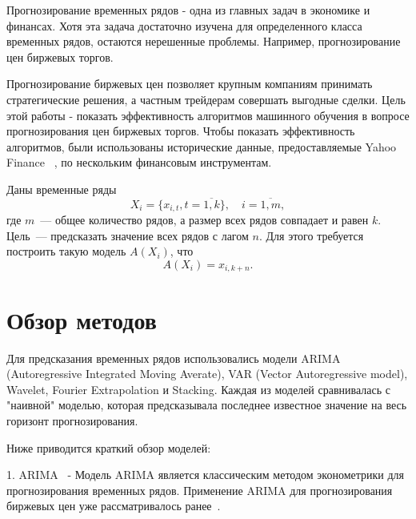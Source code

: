 \documentclass[a4paper,article,14pt]{extarticle}
\begin{document}


\tableofcontents
\pagebreak
{}

Прогнозирование временных рядов - одна из главных задач в экономике и финансах.
Хотя эта задача достаточно изучена для определенного класса временных рядов, остаются нерешенные проблемы.
Например, прогнозирование цен биржевых торгов.
\par
Прогнозирование биржевых цен позволяет крупным компаниям принимать стратегические решения, а частным трейдерам совершать выгодные сделки.
Цель этой работы - показать эффективность алгоритмов машинного обучения в вопросе прогнозирования цен биржевых торгов.
Чтобы показать эффективность алгоритмов, были использованы исторические данные, предоставляемые Yahoo Finance ~\cite{yahoo}, по нескольким финансовым инструментам.


Даны временные ряды
\begin{equation}
    {X_{i} = \{x_{i,t}, t=\overline{1,k}\},\quad i=\overline{1,m}},\label{eq:equation}
\end{equation}
где $m$~--- общее количество рядов, а размер всех рядов совпадает и равен $k$.
Цель~--- предсказать значение всех рядов с лагом $n$.
Для этого требуется построить такую модель $A(X_i)$, что
\begin{equation}
    A(X_i)=x_{i, k+n}.\label{eq:equation2}
\end{equation}


\section{Обзор методов}

Для предсказания временных рядов использовались модели ARIMA (Autoregressive Integrated Moving Averate), VAR (Vector Autoregressive model), Wavelet, Fourier Extrapolation и Stacking.
Каждая из моделей сравнивалась с "наивной" моделью, которая предсказывала последнее известное значение на весь горизонт прогнозирования.

\par
Ниже приводится краткий обзор моделей:

1.
ARIMA~\cite{arima} - Модель ARIMA является классическим методом эконометрики для прогнозирования временных рядов.
Применение ARIMA для прогнозирования биржевых цен уже рассматривалось ранее~\cite{my_arima_article}.
\end{document}
